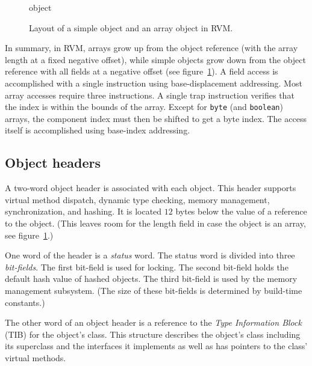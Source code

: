 \begin{figure}[htb]
\begin{gif}{object}
\vbox{
\hbox{}
}\hfil
\end{gif}
\caption{Layout of a simple object and an array object in RVM.}
\label{fig:objects}
\end{figure}

In summary, in RVM, arrays grow up from the object reference (with the
array length at a fixed negative offset), while simple objects grow
down from the object reference with all fields at a negative offset
(see figure~\ref{fig:objects}).  A field access is accomplished with a
single instruction using base-displacement addressing.  Most array
accesses require three instructions.  A single trap instruction
verifies that the index is within the bounds of the array.  Except for
{\tt byte} (and {\tt boolean}) arrays, the component index must then
be shifted to get a byte index.  The access itself is accomplished
using base-index addressing.

\JavaTMFooter

\AIXTMFooter 

\subsection{Object headers} \label{sssec:headers}
A two-word object header is associated with each object.  This header
supports virtual method dispatch, dynamic type checking, memory
management, synchronization, and hashing.  It is located $12$ bytes
below the value of a reference to the object.  (This leaves room for
the length field in case the object is an array, see
figure~\ref{fig:objects}.)

One word of the header is a {\em status} word.  The status word is
divided into three {\em bit-fields}.  The first bit-field is used for
locking.  The second bit-field holds
the default hash value of hashed objects.  The third bit-field is used
by the memory management subsystem.  (The size of these bit-fields is
determined by build-time constants.)

The other word of an object header is a reference to the {\em Type
Information Block} (TIB) for the object's class. This structure describes
the object's class including its superclass and the interfaces it implements
as well as has pointers to the class' virtual methods.

